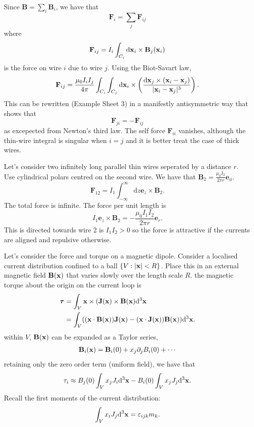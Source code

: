 \documentclass{article}
\begin{document}
Since $ \mathbf B = \sum_i \mathbf B_i $, we have that
\[
	\mathbf F_i =\sum_j \mathbf F_{ij}
\]
where
\[
	\mathbf F_{ij} = I_i\int_{C_i} \mathrm d\mathbf{x}_i \times \mathbf B_j(\mathbf{x}_i)
\]
is the force on wire $ i $ due to wire $ j $. Using the Biot-Savart law,
\[
	\mathbf F_{ij} = \frac{\mu_0 I_iI_j}{4\pi} \int_{C_i}\int_{C_j}\mathrm d\mathbf{x}_i \times\left(\frac{\mathrm d\mathbf{x}_j\times(\mathbf{x}_i-\mathbf{x}_j)}{|\mathbf{x}_i-\mathbf{x}_j|^3}\right).
\]
This can be rewritten (Example Sheet 3) in a manifestly antisymmetric way that shows that
\[
	\mathbf F_{ji} = -\mathbf F_{ij}
\]
as excepected from Newton's third law. The self force $ \mathbf F_{ii} $ vanishes, although the thin-wire integral is singular when $ i=j $ and it is better treat the case of thick wires.
\par
Let's consider two infinitely long parallel thin wires seperated by a distance $ r $. Use cylindrical polars centred on the second wire. We have that $ \mathbf B_2 = \frac{\mu_0 I_2}{2\pi r}\mathbf e_\phi $.
\[
	\mathbf F_{12} = I_1\int_{-\infty}^\infty \mathrm dz \mathbf e_z \times\mathbf B_2.
\]
The total force is infinite. The force per unit length is
\[
	I_1\mathbf e_z\times\mathbf B_2 = -\frac{\mu_0 I_1I_2}{2\pi r}\mathbf e_r.
\]
This is directed towards wire 2 is $ I_1I_2>0 $ so the force is attractive if the currents are aligned and repulsive otherwise.
\par
Let's consider the force and torque on a magnetic dipole. Consider a localised current distribution confined to a ball $ \{V:|\mathbf{x}|<R\} $. Place this in an external magnetic field $ \mathbf B(\mathbf{x}) $ that varies slowly over the length scale $ R $. the magnetic torque about the origin on the current loop is
\begin{align*}
	\boldsymbol\tau &= \int_V\mathbf{x} \times(\mathbf J(\mathbf{x}) \times \mathbf B(\mathbf{x})\mathrm d^3\mathbf{x}\\
			&= \int_V ((\mathbf{x}\cdot \mathbf B(\mathbf{x}))\mathbf J(\mathbf{x})-(\mathbf{x}\cdot \mathbf J (\mathbf{x}))\mathbf B(\mathbf{x}))\mathrm d^3\mathbf{x}.
\end{align*}
within $ V $, $ \mathbf B(\mathbf{x}) $ can be expanded as a Taylor series,
\begin{align*}
  \mathbf B_i(\mathbf{x}) = \mathbf B_i(0) +x_j \partial_jB_i(0) + \cdots 
\end{align*}
retaining only the zero order term (uniform field), we have that
\[
  \tau_i \approx B_j(0)\int_V x_j J_i\mathrm d^3\mathbf{x} - B_i(0)\int_V x_jJ_j\mathrm d^3\mathbf{x}.
\]
Recall the first moments of the current distribution:
\begin{align*}
	\int_V x_i J_j\mathrm d^3 \mathbf{x} = \varepsilon_{ijk} m_k.
\end{align*}
\end{document}
